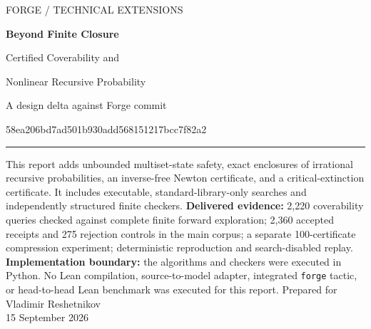 \documentclass[11pt,a4paper]{article}
\theoremstyle{definition}\newtheorem{definition}[theorem]{Definition}
\theoremstyle{remark}\newtheorem{remark}[theorem]{Remark}
\newcommand{\Forge}{\texttt{forge}}
\begin{document}
\hypersetup{pageanchor=false}
\begin{titlepage}
\thispagestyle{empty}
\vspace*{17mm}
{\sffamily\color{ink}\Large FORGE / TECHNICAL EXTENSIONS\par}
\vspace{10mm}
{\sffamily\bfseries\color{ink}\fontsize{29}{34}\selectfont Beyond Finite Closure\par}
\vspace{7mm}
{\sffamily\Large Certified Coverability and\par Nonlinear Recursive Probability\par}
\vspace{12mm}
{\large A design delta against Forge commit\par
\small\ttfamily 58ea206bd7ad501b930add568151217bcc7f82a2\par}
\vspace{10mm}
\noindent\rule{\textwidth}{0.5pt}
\vspace{5mm}
\noindent This report adds unbounded multiset-state safety, exact enclosures of irrational recursive probabilities, an inverse-free Newton certificate, and a critical-extinction certificate. It includes executable, standard-library-only searches and independently structured finite checkers.
\vspace{7mm}
\noindent\textbf{Delivered evidence:} 2,220 coverability queries checked against complete finite forward exploration; 2,360 accepted receipts and 275 rejection controls in the main corpus; a separate 100-certificate compression experiment; deterministic reproduction and search-disabled replay.
\vspace{5mm}
\noindent\textbf{Implementation boundary:} the algorithms and checkers were executed in Python. No Lean compilation, source-to-model adapter, integrated \Forge{} tactic, or head-to-head Lean benchmark was executed for this report.
\vfill
\noindent Prepared for Vladimir Reshetnikov\\
15 September 2026
\end{titlepage}
\hypersetup{pageanchor=true}
\end{document}
